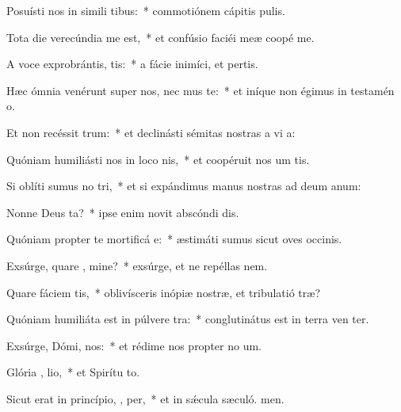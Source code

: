\item Posuísti nos in simili tibus:~* commotiónem cápitis  pulis.
\item Tota die verecúndia me   est,~* et confúsio faciéi meæ coopé me.
\item A voce exprobrántis,  tis:~* a fácie inimíci, et pertis.
\item Hæc ómnia venérunt super nos, nec  mus te:~* et iníque non égimus in testamén o.
\item Et non recéssit   trum:~* et declinásti sémitas nostras a vi a:
\item Quóniam humiliásti nos in loco nis,~* et coopéruit nos um tis.
\item Si oblíti sumus no  tri,~* et si expándimus manus nostras ad deum anum:
\item Nonne Deus  ta?~* ipse enim novit abscóndi dis.
\item Quóniam propter te mortificá  e:~* æstimáti sumus sicut oves occinis.
\item Exsúrge, quare , mine?~* exsúrge, et ne repéllas  nem.
\item Quare fáciem  tis,~* oblivísceris inópiæ nostræ, et tribulatió træ?
\item Quóniam humiliáta est in púlvere  tra:~* conglutinátus est in terra ven ter.
\item Exsúrge, Dómi,  nos:~* et rédime nos propter no um.
\item Glória ,  lio,~* et Spirítu to.
\item Sicut erat in princípio,  ,  per,~* et in sǽcula sæculó. men.
